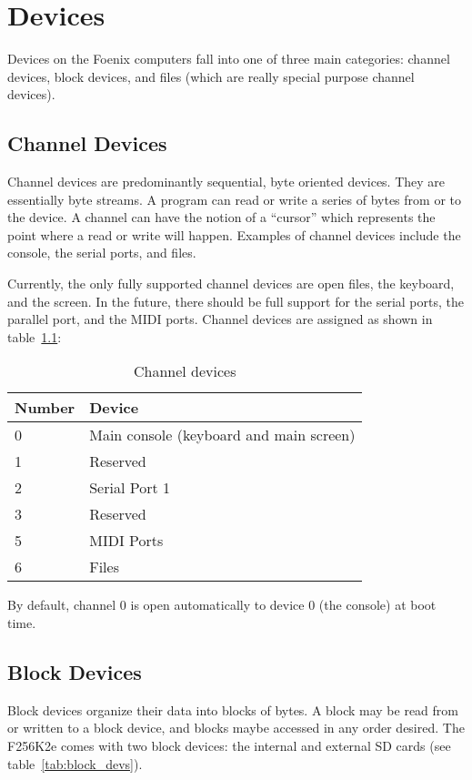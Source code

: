\chapter{Devices}
Devices on the Foenix computers fall into one of three main categories: channel devices, block devices, and files (which are really special purpose channel devices).

\section{Channel Devices}
Channel devices are predominantly sequential, byte oriented devices. They are essentially byte streams. A program can read or write a series of bytes from or to the device. A channel can have the notion of a ``cursor'' which represents the point where a read or write will happen. Examples of channel devices include the console, the serial ports, and files.

Currently, the only fully supported channel devices are open files, the keyboard, and the screen. In the future, there should be full support for the serial ports, the parallel port, and the MIDI ports. Channel devices are assigned as shown in table~\ref{tab:chan_devs}:

\begin{table}
    \begin{center}
        \begin{tabular}{|l||l|} \hline
            Number & Device \\ \hline\hline
            0 & Main console (keyboard and main screen) \\ \hline
            1 & Reserved \\ \hline
            2 & Serial Port 1 \\ \hline
            3 & Reserved \\ \hline
            5 & MIDI Ports \\ \hline
            6 & Files \\ \hline
        \end{tabular}
    \end{center}
    \caption{Channel devices}
    \label{tab:chan_devs}
\end{table}

By default, channel 0 is open automatically to device 0 (the console) at boot time.

\section{Block Devices}
Block devices organize their data into blocks of bytes. A block may be read from or written to a block device, and blocks maybe accessed in any order desired. The F256K2e comes with two block devices: the internal and external SD cards (see table~\ref{tab:block_devs}).

